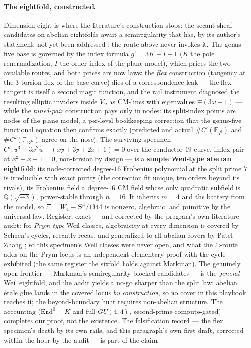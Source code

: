 \documentclass[11pt]{article}
\theoremstyle{definition}
\theoremstyle{remark}
\begin{document}
\paragraph{The eightfold, constructed.} Dimension eight is where the
literature's construction stops: the secant-sheaf candidates on abelian
eightfolds await a semiregularity that has, by its author's statement, not
yet been addressed \cite{Markman}; the route above never invokes it. The
genus-five base is governed by the index formula $g'=3K-I+1$ ($K$ the pole
renormalization, $I$ the order index of the plane model), which prices the
two available routes, and both prices are now laws: the \emph{flex}
construction (tangency at the $3$-torsion flex of the base curve) dies of a
correspondence leak --- the flex tangent is itself a second magic function,
and the rail instrument diagnosed the resulting elliptic invaders inside
$V_\omega$ as CM-lines with eigenvalues $\mp(3\omega+1)$ --- while the
\emph{tuned-pair} construction pays only in nodes: its split-index points
are nodes of the plane model, a per-level bookkeeping correction that the
genus-five functional equation then confirms exactly (predicted and actual
$\#C'(\mathbb F_{7^6})$ and $\#C'(\mathbb F_{13^6})$ agree on the nose).
The surviving specimen --- $C'\colon u^3-3x^2u+(xy+3y+2x+1)=0$ over the
conductor-$19$ curve, index pair at $x^2+x+1=0$, non-torsion by design ---
is a \textbf{simple Weil-type abelian eightfold}: its node-corrected
degree-$16$ Frobenius polynomial at the split prime $7$ is irreducible with
exact purity (the correction fit unique, ten orders beyond its rivals), its
Frobenius field a degree-$16$ CM field whose only quadratic subfield is
$\mathbb Q(\sqrt{-3})$, power-stable through $n=16$. It inherits $m=4$ and
the battery from the model, so $\Xi=W_4-\Theta^4/1944$ is nonzero,
algebraic, and primitive by the universal law. Register, exact --- and
corrected by the program's own literature audit: for \emph{Prym-type} Weil
classes, algebraicity at every dimension is covered by Schoen's cycles,
recently recast and generalized to all abelian covers by Patel--Zhang
\cite{PatelZhang}; so this specimen's Weil classes were never open, and what
the $\Xi$-route adds on the Prym locus is an independent elementary proof
with the cycle exhibited (the same register the sixfold holds against
Markman). The genuinely open frontier --- Markman's semiregularity-blocked
candidates \cite{Markman} --- is the \emph{general} Weil eightfold, and the
audit yields a no-go sharper than the split law: abelian \'etale glue lands
in the covered locus \emph{by construction}, so no cover in this playbook
reaches it; the beyond-boundary hunt requires non-abelian structure. The
accounting ($\mathrm{End}^0=K$ and full $GU(4,4)$, second-prime
compute-gated) completes our proof, not the existence. The falsification
record --- the flex specimen's death by its own rails, and this paragraph's
own first draft, corrected within the hour by the audit --- is part of the
claim.
\end{document}
